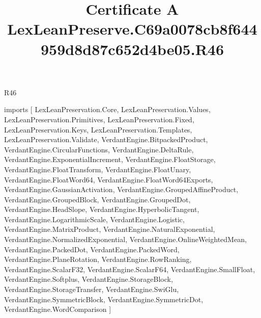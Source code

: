 \begin{lexlean}{R46}
\title{Certificate A LexLeanPreserve.C69a0078cb8f644959d8d87c652d4be05.R46}
\begin{coremodule}
imports [
  LexLeanPreservation.Core,
  LexLeanPreservation.Values,
  LexLeanPreservation.Primitives,
  LexLeanPreservation.Fixed,
  LexLeanPreservation.Keys,
  LexLeanPreservation.Templates,
  LexLeanPreservation.Validate,
  VerdantEngine.BitpackedProduct,
  VerdantEngine.CircularFunctions,
  VerdantEngine.DeltaRule,
  VerdantEngine.ExponentialIncrement,
  VerdantEngine.FloatStorage,
  VerdantEngine.FloatTransform,
  VerdantEngine.FloatUnary,
  VerdantEngine.FloatWord64,
  VerdantEngine.FloatWord64Exports,
  VerdantEngine.GaussianActivation,
  VerdantEngine.GroupedAffineProduct,
  VerdantEngine.GroupedBlock,
  VerdantEngine.GroupedDot,
  VerdantEngine.HeadSlope,
  VerdantEngine.HyperbolicTangent,
  VerdantEngine.LogarithmicScale,
  VerdantEngine.Logistic,
  VerdantEngine.MatrixProduct,
  VerdantEngine.NaturalExponential,
  VerdantEngine.NormalizedExponential,
  VerdantEngine.OnlineWeightedMean,
  VerdantEngine.PackedDot,
  VerdantEngine.PackedWord,
  VerdantEngine.PlaneRotation,
  VerdantEngine.RowRanking,
  VerdantEngine.ScalarF32,
  VerdantEngine.ScalarF64,
  VerdantEngine.SmallFloat,
  VerdantEngine.Softplus,
  VerdantEngine.StorageBlock,
  VerdantEngine.StorageTransfer,
  VerdantEngine.SwiGlu,
  VerdantEngine.SymmetricBlock,
  VerdantEngine.SymmetricDot,
  VerdantEngine.WordComparison
]


\end{coremodule}
\end{lexlean}
